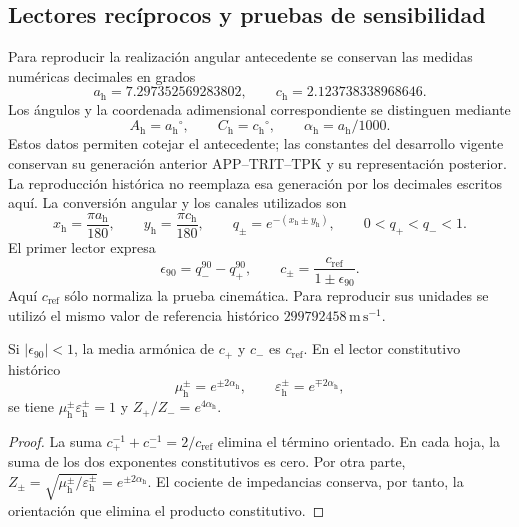 \subsection{Lectores recíprocos y pruebas de sensibilidad}
\label{iii:hist:n6d}

Para reproducir la realización angular antecedente se conservan las medidas
numéricas decimales en grados
\[
 a_{\mathrm h}=7.297352569283802,\qquad
 c_{\mathrm h}=2.123738338968646.
\]
Los ángulos y la coordenada adimensional correspondiente se distinguen mediante
\[
 A_{\mathrm h}=a_{\mathrm h}{}^\circ,\qquad
 C_{\mathrm h}=c_{\mathrm h}{}^\circ,\qquad
 \alpha_{\mathrm h}=a_{\mathrm h}/1000.
\]
Estos datos permiten cotejar el antecedente; las constantes del desarrollo
vigente conservan su generación anterior APP--TRIT--TPK y su representación
posterior. La reproducción histórica no reemplaza esa generación por los
decimales escritos aquí. La conversión angular y los canales utilizados son
\[
 x_{\mathrm h}=\frac{\pi a_{\mathrm h}}{180},\qquad
 y_{\mathrm h}=\frac{\pi c_{\mathrm h}}{180},\qquad
 q_\pm=e^{-(x_{\mathrm h}\pm y_{\mathrm h})},
 \qquad0<q_+<q_-<1.
\]
El primer lector expresa
\[
 \epsilon_{90}=q_-^{90}-q_+^{90},\qquad
 c_\pm=\frac{c_{\mathrm{ref}}}{1\pm\epsilon_{90}}.
\]
Aquí $c_{\mathrm{ref}}$ sólo normaliza la prueba cinemática. Para reproducir
sus unidades se utilizó el mismo valor de referencia histórico
$299792458\,\mathrm{m\,s^{-1}}$.

\begin{proposition}
\label{iii:hist:lectores}
Si $|\epsilon_{90}|<1$, la media armónica de $c_+$ y $c_-$ es
$c_{\mathrm{ref}}$. En el lector constitutivo histórico
\[
 \mu_{\mathrm h}^{\pm}=e^{\pm2\alpha_{\mathrm h}},\qquad
 \varepsilon_{\mathrm h}^{\pm}=e^{\mp2\alpha_{\mathrm h}},
\]
se tiene $\mu_{\mathrm h}^{\pm}\varepsilon_{\mathrm h}^{\pm}=1$ y
$Z_+/Z_-=e^{4\alpha_{\mathrm h}}$.
\end{proposition}
\begin{proof}
La suma $c_+^{-1}+c_-^{-1}=2/c_{\mathrm{ref}}$ elimina el término orientado.
En cada hoja, la suma de los dos exponentes constitutivos es cero.
Por otra parte, $Z_\pm=\sqrt{\mu_{\mathrm h}^{\pm}/
\varepsilon_{\mathrm h}^{\pm}}=e^{\pm2\alpha_{\mathrm h}}$.
El cociente de impedancias conserva, por tanto, la orientación que elimina
el producto constitutivo.
\end{proof}


